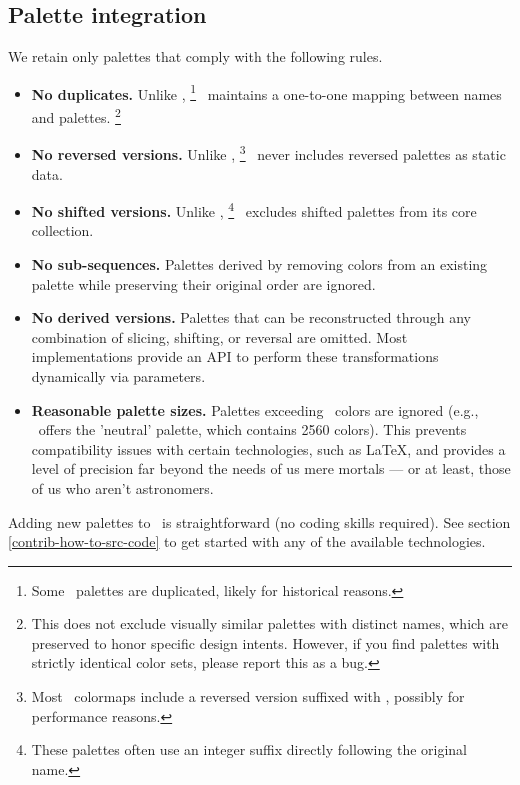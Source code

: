 \documentclass{tutodoc}
\begin{document}

\subsection{Palette integration}

We retain only palettes that comply with the following rules.
%
\begin{itemize}
    \item \textbf{No duplicates.}
    Unlike \matplotlib,%
    \footnote{
        Some \matplotlib\ palettes are duplicated, likely for historical reasons.
    }
    \thisproj\ maintains a one-to-one mapping between names and palettes.%
    \footnote{
        This does not exclude visually similar palettes with distinct names, which are preserved to honor specific design intents. However, if you find palettes with strictly identical color sets, please report this as a bug.
    }

    \item \textbf{No reversed versions.}
    Unlike \matplotlib,%
    \footnote{
        Most \matplotlib\ colormaps include a reversed version suffixed with , possibly for performance reasons.
    }
    \thisproj\ never includes reversed palettes as static data.

    \item \textbf{No shifted versions.}
    Unlike ,%
    \footnote{
        These palettes often use an integer suffix directly following the original name.
    }
    \thisproj\ excludes shifted palettes from its core collection.

    \item \textbf{No sub-sequences.}
    Palettes derived by removing colors from an existing palette while preserving their original order are ignored.

    \item \textbf{No derived versions.}
    Palettes that can be reconstructed through any combination of slicing, shifting, or reversal are omitted. Most implementations provide an API to perform these transformations dynamically via parameters.

    \item \textbf{Reasonable palette sizes.} 
    Palettes exceeding \palMaxSize\ colors are ignored (e.g., \cmasher\ offers the 'neutral' palette, which contains 2560 colors). 
    This prevents compatibility issues with certain technologies, such as \LaTeX, and provides a level of precision far beyond the needs of us mere mortals — or at least, those of us who aren't astronomers.
\end{itemize}




\begin{tdocnote}
    Adding new palettes to \thisproj\ is straightforward (no coding skills required).
    See section \ref{contrib-how-to-src-code} to get started with any of the available technologies.
\end{tdocnote}
\end{document}
